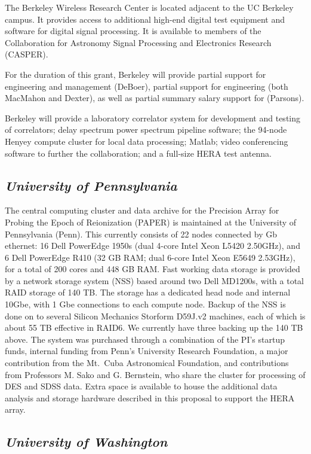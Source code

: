 \documentclass[11pt]{article}
\begin{document}
The Berkeley Wireless Research Center is located adjacent to the UC Berkeley
campus. It provides access to additional high-end digital test equipment and
software for digital signal processing.  It is available to members of the
Collaboration for Astronomy Signal Processing and Electronics Research (CASPER).

For the duration of this grant, Berkeley will provide partial support for engineering and management (DeBoer), 
partial support for engineering (both MacMahon and Dexter),
as well as partial summary salary support for (Parsons).

Berkeley will provide a laboratory correlator system for development and testing of correlators; delay spectrum power spectrum pipeline software; 
the 94-node Henyey compute cluster for local data processing; Matlab; video conferencing software to further the collaboration; and a full-size 
HERA test antenna.

\subsection*{\it University of Pennsylvania}

The central computing cluster and data archive for the Precision Array for Probing the Epoch of Reionization (PAPER) is maintained at the University of Pennsylvania (Penn).  This currently consists of 22 nodes connected by Gb ethernet: 16 Dell PowerEdge 1950s (dual 4-core Intel Xeon L5420 \@ 2.50GHz), and 6 Dell PowerEdge R410 (32 GB RAM; dual 6-core Intel Xeon E5649 \@ 2.53GHz), for a total of 200 cores and 448 GB RAM.  Fast working data storage is provided by a network storage system (NSS) based around two Dell MD1200s, with a total RAID storage of 140 TB.  The storage has a dedicated head node and internal 10Gbe, with 1 Gbe connections to each compute node. Backup of the NSS is done on to several Silicon Mechanics Storform D59J.v2 machines, each of which is about 55 TB effective in RAID6.  We currently have three backing up the 140 TB above. The system was purchased through a combination of the PI's startup funds, internal funding from Penn's University Research Foundation, a major contribution from the Mt.~Cuba Astronomical Foundation, and contributions from Professors M. Sako and G. Bernstein, who share the cluster for processing of DES and SDSS data.  Extra space is available to house the additional data analysis and storage hardware described in this proposal to support the HERA array.


\subsection*{\it University of Washington}
\end{document}
